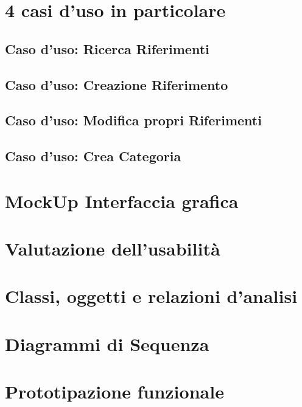 \raggedright{\section{4 casi d'uso in particolare}}
\raggedright{\subsection{Caso d'uso: Ricerca Riferimenti}}
\raggedright{\subsection{Caso d'uso: Creazione Riferimento}}
\raggedright{\subsection{Caso d'uso: Modifica propri Riferimenti}}
\raggedright{\subsection{Caso d'uso: Crea Categoria}}






\raggedright{\section{MockUp Interfaccia grafica}}

\raggedright{\section{Valutazione dell'usabilità}}

\raggedright{\section{Classi, oggetti e relazioni d'analisi}}

\raggedright{\section{Diagrammi di Sequenza}}

\raggedright{\section{Prototipazione funzionale}}










